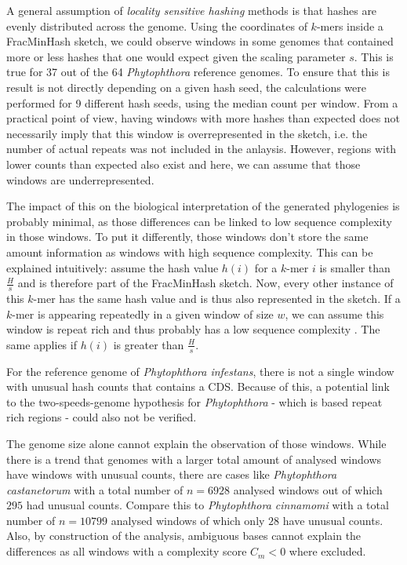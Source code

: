 A general assumption of \textit{locality sensitive hashing} methods is that
hashes are evenly distributed across the genome. Using the coordinates of
$k$-mers inside a FracMinHash sketch, we could observe windows in some genomes
that contained more or less hashes that one would expect given the scaling
parameter $s$. This is true for 37 out of the 64 \textit{Phytophthora} reference
genomes. To ensure that this is result is not directly depending on a given hash
seed, the calculations were performed for 9 different hash seeds, using the
median count per window. From a practical point of view, having windows with
more hashes than expected does not necessarily imply that this window is
overrepresented in the sketch, i.e. the number of actual repeats was not
included in the anlaysis. However, regions with lower counts than expected also
exist and here, we can assume that those windows are underrepresented.

The impact of this on the biological interpretation of the generated phylogenies
is probably minimal, as those differences can be linked to low sequence
complexity in those windows. To put it differently, those windows don't store
the same amount information as windows with high sequence complexity. This can
be explained intuitively: assume the hash value $h(i)$ for a $k$-mer $i$ is
smaller than $\frac{H}{s}$ and is therefore part of the FracMinHash sketch. Now,
every other instance of this $k$-mer has the same hash value and is thus also
represented in the sketch. If a $k$-mer is appearing repeatedly in a given
window of size $w$, we can assume this window is repeat rich and thus probably
has a low sequence complexity \cite{pirogovHighcomplexityRegionsMammalian2019}.
The same applies if $h(i)$ is greater than $\frac{H}{s}$.

For the reference genome of \textit{Phytophthora infestans}, there is not a
single window with unusual hash counts that contains a CDS. Because of this, a
potential link to the two-speeds-genome hypothesis for \textit{Phytophthora} -
which is based repeat rich regions - could also not be verified.

The genome size alone cannot explain the observation of those windows. While
there is a trend that genomes with a larger total amount of analysed windows
have windows with unusual counts, there are cases like \textit{Phytophthora
castanetorum} with a total number of $n=6928$ analysed windows out of which
$295$ had unusual counts. Compare this to \textit{Phytophthora cinnamomi} with a
total number of $n=10799$ analysed windows of which only $28$ have unusual
counts. Also, by construction of the analysis, ambiguous bases cannot explain
the differences as all windows with a complexity score $C_m < 0$ where excluded. 

